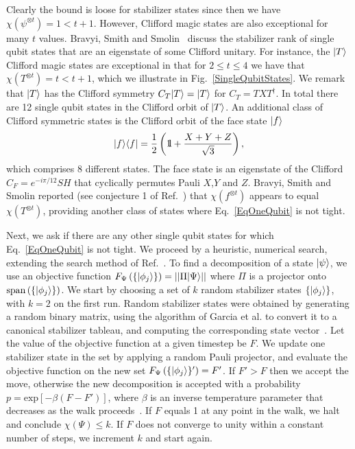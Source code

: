Clearly the bound is loose for stabilizer states since then we have $\chi( \psi^{\otimes t})=1 < t+1$.  However, Clifford magic states are also exceptional for many $t$ values.  Bravyi, Smith and Smolin~\cite{Bravyi16stabRank} discuss the stabilizer rank of single qubit states that are an eigenstate of some Clifford unitary.  For instance, the $\vert T\rangle$  Clifford magic states are exceptional in that for $ 2 \leq t \leq 4$ we have that $\chi(T^{\otimes t})=t < t+1$, which we illustrate in Fig.~\ref{SingleQubitStates}.  We remark that $\vert T\rangle$ has the Clifford symmetry $C_T \vert T\rangle=\vert T\rangle$ for $C_T = TXT^\dagger$. In total there are 12 single qubit states in the Clifford orbit of $\vert T\rangle$. An additional class of Clifford symmetric states is the Clifford orbit of the face state $\vert f\rangle$ 
\begin{equation}
	\kb{f}{f} = \frac{1}{2} \left( \id + \frac{X + Y + Z}{\sqrt{3}} \right) ,
\end{equation}	
which comprises 8 different states.  The face state is an eigenstate of the Clifford $C_F=e^{-i \pi /12}SH$  that cyclically permutes Pauli $X$,$Y$ and $Z$.   Bravyi, Smith and Smolin reported (see conjecture 1 of Ref.~\cite{Bravyi16stabRank}) that $\chi(f^{\otimes t})$ appears to equal $\chi(T^{\otimes t})$, providing another class of states where Eq.~\eqref{EqOneQubit} is not tight.

Next, we ask if there are any other single qubit states for which Eq.~\eqref{EqOneQubit} is not tight.  We proceed by a heuristic, numerical search, extending the search method of Ref.~\cite{Bravyi16stabRank}. To find a decomposition of a state $\vert\psi\rangle$, we use an objective function $F_{\Psi}\left(\{\vert\phi_{j}\rangle\}\right)=||\Pi\vert\Psi\rangle||$ where $\Pi$ is a projector onto $\mathrm{span}\left(\{\vert\phi_{j}\rangle\}\right)$.   We start by choosing a set of $k$ random stabilizer states $\{\vert\phi_{j}\rangle\}$, with $k=2$ on the first run.  Random stabilizer states were obtained by generating a random binary matrix, using the algorithm of Garcia et al. to convert it to a canonical stabilizer tableau, and computing the corresponding state vector~\cite{garcia2012efficient}.  Let the value of the objective function at a given timestep be $F$. We update one stabilizer state in the set by applying a random Pauli projector, and evaluate the objective function on the new set $F_{\Psi}\left(\{\vert\phi_{j}\rangle\}'\right)=F'$. If $F'>F$ then we accept the move, otherwise the new decomposition is accepted with a probability $p=\text{exp}\left[-\beta\left(F-F'\right)\right]$, where $\beta$ is an inverse temperature parameter that decreases as the walk proceeds~\cite{Bravyi16stabRank}.  If $F$ equals 1 at any point in the walk, we halt and conclude $\chi(\Psi) \leq k$.  If $F$ does not converge to unity within a constant number of steps, we increment $k$ and start again.

